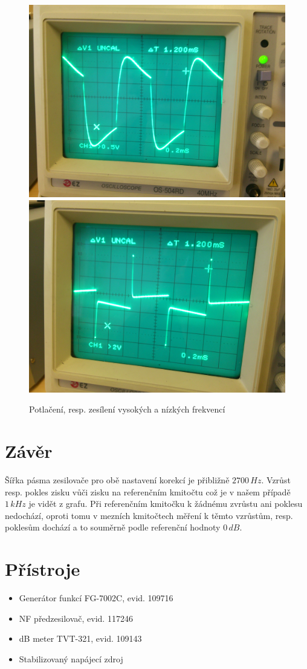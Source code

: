 \documentclass[12pt]{article} %
\begin{document}
\begin{figure}[H]
\includegraphics[scale=0.065]{IMG_20131119_133721.jpg}
\includegraphics[scale=0.065]{IMG_20131119_133835.jpg}
\caption{Potlačení, resp. zesílení vysokých a nízkých frekvencí}
\end{figure}

\section{Závěr}
Šířka pásma zesilovače pro obě nastavení korekcí je přibližně $2700\,Hz$. Vzrůst resp. pokles zisku vůči zisku na referenčním kmitočtu což je v našem případě $1\,kHz$ je vidět z grafu. Při referenčním kmitočku k žádnému zvrůstu ani poklesu nedochází, oproti tomu v mezních kmitočtech měření k těmto vzrůstům, resp. poklesům dochází a to souměrně podle referenční hodnoty $0\,dB$.

\section{Přístroje}
\begin{itemize}
\item Generátor funkcí FG-7002C, evid. 109716
\item NF předzesilovač, evid. 117246
\item dB meter TVT-321, evid. 109143
\item Stabilizovaný napájecí zdroj
\end{itemize}
\end{document}
